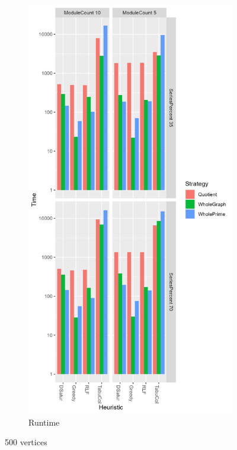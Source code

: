 \documentclass[a4paper]{article}
\begin{document}
\begin{figure}[p]
\begin{subfigure}{.4\paperwidth}
    \end{subfigure}%
    \begin{subfigure}{.4\paperwidth}
        \includegraphics[width=\columnwidth]{Tables/500Time.png}
      \caption{Runtime}
      \label{fig:500t}
    \end{subfigure}
\caption{500 vertices}
\label{fig:500}
\end{figure}
\end{document}
